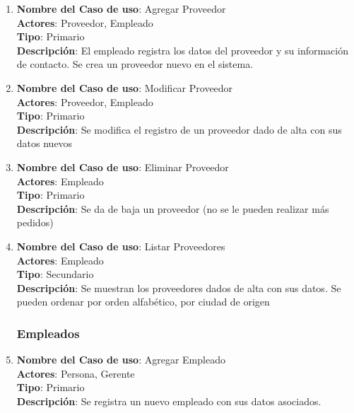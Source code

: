 \documentclass[12pt]{extarticle}
\begin{document}
\begin{spacing}{1.2}
\begin{enumerate}
        \item 	\textbf{Nombre del Caso de uso}: Agregar Proveedor\\
                \textbf{Actores}: Proveedor, Empleado\\
                \textbf{Tipo}: Primario\\
                \textbf{Descripción}: El empleado registra los datos del proveedor y su información de contacto. Se crea un proveedor nuevo en el sistema.
        
        \item 	\textbf{Nombre del Caso de uso}: Modificar Proveedor\\
                \textbf{Actores}: Proveedor, Empleado\\
                \textbf{Tipo}: Primario\\
                \textbf{Descripción}: Se modifica el registro de un proveedor dado de alta con sus datos nuevos
        
        \item 	\textbf{Nombre del Caso de uso}: Eliminar Proveedor\\
                \textbf{Actores}: Empleado\\
                \textbf{Tipo}: Primario\\
                \textbf{Descripción}: Se da de baja un proveedor (no se le pueden realizar más pedidos)
        
        \item 	\textbf{Nombre del Caso de uso}: Listar Proveedores\\
                \textbf{Actores}: Empleado\\
                \textbf{Tipo}: Secundario\\
                \textbf{Descripción}: Se muestran los proveedores dados de alta con sus datos. Se pueden ordenar por orden alfabético, por ciudad de origen



        \subsubsection{Empleados}



        \item 	\textbf{Nombre del Caso de uso}: Agregar Empleado\\
                \textbf{Actores}: Persona, Gerente\\
                \textbf{Tipo}: Primario\\
                \textbf{Descripción}: Se registra un nuevo empleado con sus datos asociados.
        

\end{enumerate}
\end{spacing}
\end{document}

